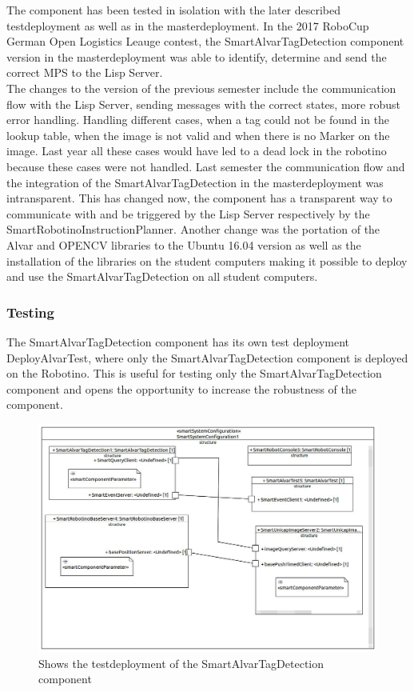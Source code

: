 The component has been tested in isolation with the later described testdeployment as well as in the masterdeployment. In the 2017 RoboCup German Open Logistics Leauge contest, the SmartAlvarTagDetection component version in the masterdeployment was able to identify, determine and send the correct MPS to the Lisp Server. \\
The changes to the version of the previous semester include the communication flow with the Lisp Server, sending messages with the correct states, more robust error handling. Handling different cases, when a tag could not be found in the lookup table, when the image is not valid and when there is no Marker on the image. Last year all these cases would have led to a dead lock in the robotino because these cases were not handled. Last semester the communication flow and the integration of the SmartAlvarTagDetection in the masterdeployment was intransparent. This has changed now, the component has a transparent way to communicate with and be triggered by the Lisp Server respectively by the SmartRobotinoInstructionPlanner. Another change was the portation of the Alvar and OPENCV libraries to the Ubuntu 16.04 version as well as the installation of the libraries on the student computers making it possible to deploy and use the SmartAlvarTagDetection on all student computers.

\subsubsection{Testing}

The SmartAlvarTagDetection component has its own test deployment DeployAlvarTest, where only the SmartAlvarTagDetection component is deployed on the Robotino. This is useful for testing only the SmartAlvarTagDetection component and opens the opportunity to increase the robustness of the component. \\

\begin{figure}[h]
\centering
\includegraphics[scale=0.3]{pic/DeployAlvarTest.jpg}
\caption{Shows the testdeployment of the SmartAlvarTagDetection component}
\label{fig:smartAlvarDeploy}
\end{figure}

